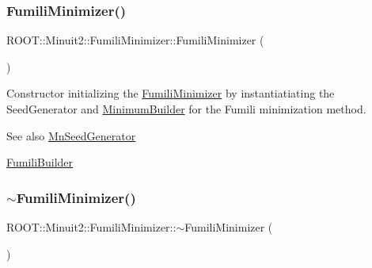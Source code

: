 \subsubsection{\texorpdfstring{FumiliMinimizer()}{FumiliMinimizer()}\hspace{0.1cm}{\footnotesize\ttfamily [2/3]}}
{\footnotesize\ttfamily R\+O\+O\+T\+::\+Minuit2\+::\+Fumili\+Minimizer\+::\+Fumili\+Minimizer (\begin{DoxyParamCaption}{ }\end{DoxyParamCaption})\hspace{0.3cm}{\ttfamily [inline]}}

Constructor initializing the \mbox{\hyperlink{classROOT_1_1Minuit2_1_1FumiliMinimizer}{Fumili\+Minimizer}} by instantiatiating the Seed\+Generator and \mbox{\hyperlink{classROOT_1_1Minuit2_1_1MinimumBuilder}{Minimum\+Builder}} for the Fumili minimization method.

\begin{DoxySeeAlso}{See also}
\mbox{\hyperlink{classROOT_1_1Minuit2_1_1MnSeedGenerator}{Mn\+Seed\+Generator}}

\mbox{\hyperlink{classROOT_1_1Minuit2_1_1FumiliBuilder}{Fumili\+Builder}} 
\end{DoxySeeAlso}
\mbox{\label{classROOT_1_1Minuit2_1_1FumiliMinimizer_a2e482171de26d153b98228aa41adee3e}} 
\subsubsection{\texorpdfstring{$\sim$FumiliMinimizer()}{~FumiliMinimizer()}\hspace{0.1cm}{\footnotesize\ttfamily [2/3]}}
{\footnotesize\ttfamily R\+O\+O\+T\+::\+Minuit2\+::\+Fumili\+Minimizer\+::$\sim$\+Fumili\+Minimizer (\begin{DoxyParamCaption}{ }\end{DoxyParamCaption})\hspace{0.3cm}{\ttfamily [inline]}}

\mbox{\label{classROOT_1_1Minuit2_1_1FumiliMinimizer_af33036073afd0161dbe9fd2fe0866575}} 
